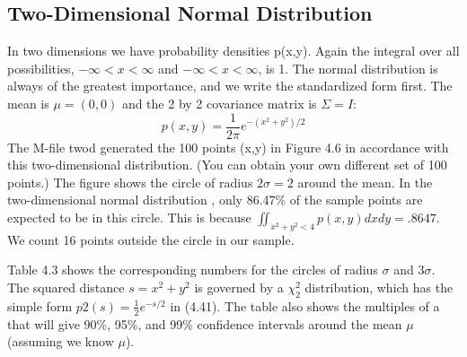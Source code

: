 	\subsection{Two-Dimensional Normal Distribution}
	In two dimensions we have probability densities p(x,y). Again the integral over all possibilities, $-\infty<x<\infty$ and $-\infty<x<\infty$, is 1. The normal distribution is always of the greatest importance, and we write the standardized form first. The mean is $\mu=(0,0)$ and the 2 by 2 covariance matrix is $\Sigma= I$:
	\begin{equation}
	p(x,y)=\frac{1}{2\pi}e^{-(x^2+y^2)/2}
	\end{equation}
	The M-file twod generated the 100 points (x,y) in Figure 4.6 in accordance with this
	two-dimensional distribution. (You can obtain your own different set of 100 points.) The
	figure shows the circle of radius $2\sigma=2$ around the mean. In the two-dimensional normal distribution , only 86.47\% of the sample points are expected to be in this circle. This is because $\iint_{x^2+y^2<4}p(x,y)dxdy=.8647.$ We count 16 points outside the circle in our sample.
	
	Table 4.3 shows the corresponding numbers for the circles of radius $\sigma$ and $3\sigma$. The squared distance $s=x^2+y^2$ is governed by a $\chi^2_2$ distribution, which has the simple form $p2(s)=\frac{1}{2}e^{-s/2}$ in (4.41). The table also shows the multiples of a that will give 90\%, 95\%, and 99\% confidence intervals around the mean $\mu$(assuming we know $\mu$).
	
